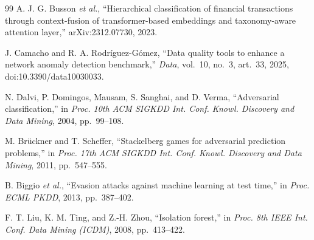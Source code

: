 \documentclass[conference]{IEEEtran}
\begin{document}
\begin{thebibliography}{99}
A. J. G. Busson \emph{et al.}, ``Hierarchical classification of financial
transactions through context-fusion of transformer-based embeddings and
taxonomy-aware attention layer,'' arXiv:2312.07730, 2023.

J. Camacho and R. A. Rodríguez-Gómez, ``Data quality tools to enhance a
network anomaly detection benchmark,'' \emph{Data}, vol.~10, no.~3, art.~33,
2025, doi:10.3390/data10030033.

N. Dalvi, P. Domingos, Mausam, S. Sanghai, and D. Verma, ``Adversarial
classification,'' in \emph{Proc. 10th ACM SIGKDD Int. Conf. Knowl. Discovery
and Data Mining}, 2004, pp.~99--108.

M. Brückner and T. Scheffer, ``Stackelberg games for adversarial prediction
problems,'' in \emph{Proc. 17th ACM SIGKDD Int. Conf. Knowl. Discovery and
Data Mining}, 2011, pp.~547--555.

B. Biggio \emph{et al.}, ``Evasion attacks against machine learning at test
time,'' in \emph{Proc. ECML PKDD}, 2013, pp.~387--402.

F. T. Liu, K. M. Ting, and Z.-H. Zhou, ``Isolation forest,'' in \emph{Proc.
8th IEEE Int. Conf. Data Mining (ICDM)}, 2008, pp.~413--422.

\end{thebibliography}
\end{document}
